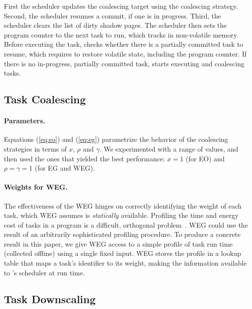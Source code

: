 First the scheduler updates the coalescing target using the coalescing
strategy.  Second, the scheduler resumes a commit, if one is in progress. Third,
the scheduler clears the list of dirty shadow pages. The scheduler then 
sets the program counter to the next task to run, which \sys tracks in  
non-volatile memory.  
%
Before executing the task, \sys checks whether there is a partially committed
task to resume, which requires \sys to restore volatile state, including the program
counter.  
%
If there is no in-progress, partially committed task, \sys starts executing and
coalescing tasks. 

%
\subsection{Task Coalescing}
%
%
\paragraph{Parameters.}
Equations (\ref{eq:eo}) and (\ref{eq:eg}) parametrize the behavior of the coalescing strategies in terms of $x$, $\rho$ and $\gamma$.
We experimented with a range of values, and then used the ones that yielded the best performance: $x = 1$ (for EO) and $\rho = \gamma = 1$ (for EG and WEG).

\paragraph{Weights for WEG.}
The effectiveness of the WEG hinges on correctly identifying the weight of each task, which WEG assumes is {\em statically} available. Profiling the time and energy cost of tasks in a program is a difficult, orthogonal problem~\cite{cleancut_2018,baghsorkhi_cgo_2018}. WEG could use the result of an arbitrarily sophisticated profiling procedure. To produce a concrete result in this paper, we give WEG access to a simple profile of task run time (collected offline) using a single fixed input. WEG stores the profile in a lookup table that maps a task's identifier to its weight, making the information available to \sys's scheduler at run time.

%
\subsection{Task Downscaling}
%
%

